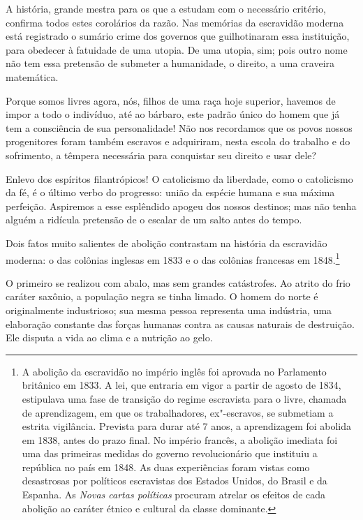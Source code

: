 \begin{linenumbers}
A história, grande mestra para os que a estudam com o necessário
critério, confirma todos estes corolários da razão. Nas memórias da
escravidão moderna está registrado o sumário crime dos governos que
guilhotinaram essa instituição, para obedecer à fatuidade de uma
utopia. De uma utopia, sim; pois outro nome não tem essa pretensão de
submeter a humanidade, o direito, a uma craveira matemática.

Porque somos livres agora, nós, filhos de uma raça hoje superior,
havemos de impor a todo o indivíduo, até ao bárbaro, este padrão único
do homem que já tem a consciência de sua personalidade! Não nos
recordamos que os povos nossos progenitores foram também escravos e
adquiriram, nesta escola do trabalho e do sofrimento, a têmpera
necessária para conquistar seu direito e usar dele?

Enlevo dos espíritos filantrópicos! O catolicismo da liberdade, como o
catolicismo da fé, é o último verbo do progresso: união da espécie
humana e sua máxima perfeição. Aspiremos a esse esplêndido apogeu dos
nossos destinos; mas não tenha alguém a ridícula pretensão de o escalar
de um salto antes do tempo. 

Dois fatos muito salientes de abolição contrastam na história da
escravidão moderna: o das colônias inglesas em 1833 e o das colônias
francesas em
1848.\footnote{ A abolição da escravidão no império inglês foi aprovada no Parlamento britânico em \label{nota1}
1833. A lei, que entraria em vigor a partir de agosto de 1834,
estipulava uma fase de transição do regime escravista para o livre,
chamada de aprendizagem, em que os trabalhadores, ex"-escravos, se
submetiam a estrita vigilância. Prevista para durar até 7 anos, a
aprendizagem foi abolida em 1838, antes do prazo final. No império
francês, a abolição imediata foi uma das primeiras medidas do governo
revolucionário que instituiu a república no país em 1848. As duas
experiências foram vistas como desastrosas por políticos escravistas
dos Estados Unidos, do Brasil e da Espanha. As \textit{Novas cartas
políticas} procuram atrelar os efeitos de cada abolição ao caráter
étnico e cultural da classe dominante.}
 
O primeiro se realizou com abalo, mas sem grandes catástrofes. Ao atrito
do frio caráter saxônio, a população negra se tinha limado. O homem do
norte é originalmente industrioso; sua mesma pessoa representa uma
indústria, uma elaboração constante das forças humanas contra as causas
naturais de destruição. Ele disputa a vida ao clima e a nutrição ao gelo. 


\end{linenumbers}
